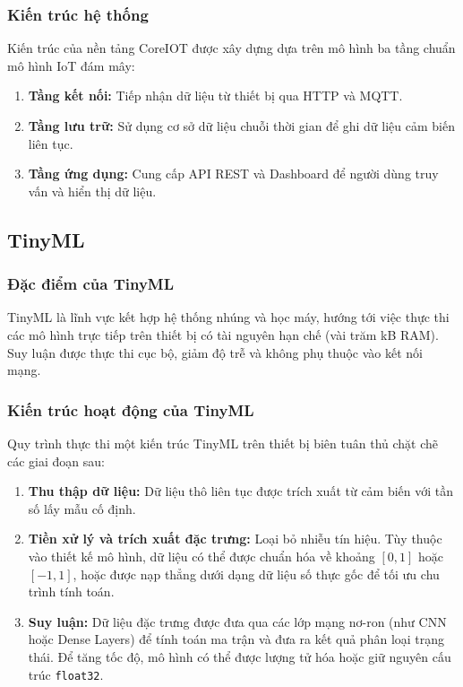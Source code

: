 \subsubsection{Kiến trúc hệ thống}
Kiến trúc của nền tảng CoreIOT được xây dựng dựa trên mô hình ba tầng chuẩn mô hình IoT đám mây:
\begin{enumerate}
    \item \textbf{Tầng kết nối:} Tiếp nhận dữ liệu từ thiết bị qua HTTP và MQTT.
    \item \textbf{Tầng lưu trữ:} Sử dụng cơ sở dữ liệu chuỗi thời gian để ghi dữ liệu cảm biến liên tục.
    \item \textbf{Tầng ứng dụng:} Cung cấp API REST và Dashboard để người dùng truy vấn và hiển thị dữ liệu.
\end{enumerate}


\subsection{TinyML}

\subsubsection{Đặc điểm của TinyML}
TinyML là lĩnh vực kết hợp hệ thống nhúng và học máy, hướng tới việc thực thi các mô hình trực tiếp trên thiết bị có tài nguyên hạn chế (vài trăm kB RAM). Suy luận được thực thi cục bộ, giảm độ trễ và không phụ thuộc vào kết nối mạng.

\subsubsection{Kiến trúc hoạt động của TinyML}
Quy trình thực thi một kiến trúc TinyML trên thiết bị biên tuân thủ chặt chẽ các giai đoạn sau:
\begin{enumerate}
    \item \textbf{Thu thập dữ liệu:} Dữ liệu thô liên tục được trích xuất từ cảm biến với tần số lấy mẫu cố định.
    \item \textbf{Tiền xử lý và trích xuất đặc trưng:} Loại bỏ nhiễu tín hiệu. Tùy thuộc vào thiết kế mô hình, dữ liệu có thể được chuẩn hóa về khoảng $[0, 1]$ hoặc $[-1, 1]$, hoặc được nạp thẳng dưới dạng dữ liệu số thực gốc để tối ưu chu trình tính toán.
    \item \textbf{Suy luận:} Dữ liệu đặc trưng được đưa qua các lớp mạng nơ-ron (như CNN hoặc Dense Layers) để tính toán ma trận và đưa ra kết quả phân loại trạng thái. Để tăng tốc độ, mô hình có thể được lượng tử hóa hoặc giữ nguyên cấu trúc \texttt{float32}.
\end{enumerate}

